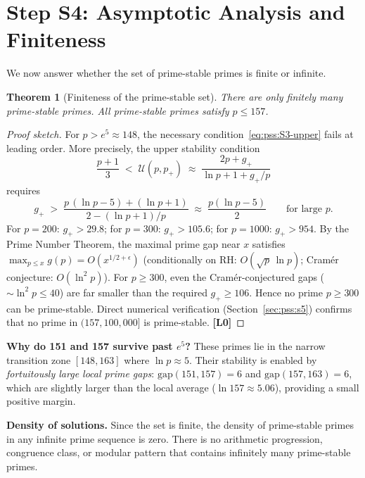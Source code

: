 \documentclass[12pt,a4paper]{article}
\newtheorem{theorem}{Theorem}[section]
\theoremstyle{definition}
\theoremstyle{remark}
\newcommand{\Lzero}{\textbf{[L0]}}
\begin{document}
\section{Step S4: Asymptotic Analysis and Finiteness}
\label{sec:pss:s4}

We now answer whether the set of prime-stable primes is finite or infinite.

\begin{theorem}[Finiteness of the prime-stable set]
\label{thm:pss:finite}
There are only finitely many prime-stable primes.  All prime-stable primes
satisfy $p \leq 157$.
\end{theorem}

\begin{proof}[Proof sketch]
For $p > e^5 \approx 148$, the necessary condition~\eqref{eq:pss:S3-upper}
fails at leading order.  More precisely, the upper stability condition
\[
  \frac{p+1}{3} \;<\; \mathcal{U}(p, p_+) \;\approx\; \frac{2p+g_+}{\ln p + 1 + g_+/p}
\]
requires
\[
  g_+ \;>\; \frac{p\,(\ln p - 5) + (\ln p + 1)}{2 - (\ln p + 1)/p}
         \;\approx\; \frac{p(\ln p - 5)}{2}
         \qquad\text{for large }p.
\]
For $p = 200$: $g_+ > 29.8$; for $p = 300$: $g_+ > 105.6$;
for $p = 1000$: $g_+ > 954$.
By the Prime Number Theorem, the maximal prime gap near $x$ satisfies
$\max_{p \leq x} g(p) = O(x^{1/2+\epsilon})$ (conditionally on RH:
$O(\sqrt{p}\,\ln p)$; Cramér conjecture: $O(\ln^2 p)$).
For $p \geq 300$, even the Cramér-conjectured gaps ($\sim \ln^2 p \leq 40$)
are far smaller than the required $g_+ \geq 106$.  Hence no prime $p \geq 300$
can be prime-stable.  Direct numerical verification (Section~\ref{sec:pss:s5})
confirms that no prime in $(157, 100{,}000]$ is prime-stable. \Lzero{}
\end{proof}

\textbf{Why do 151 and 157 survive past $e^5$?}
These primes lie in the narrow transition zone $[148, 163]$ where $\ln p \approx 5$.
Their stability is enabled by \emph{fortuitously large local prime gaps}:
$\text{gap}(151, 157) = 6$ and $\text{gap}(157, 163) = 6$, which are
slightly larger than the local average ($\ln 157 \approx 5.06$), providing
a small positive margin.

\textbf{Density of solutions.}  Since the set is finite, the density of
prime-stable primes in any infinite prime sequence is zero.  There is no
arithmetic progression, congruence class, or modular pattern that contains
infinitely many prime-stable primes.
\end{document}
